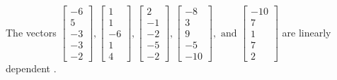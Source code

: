 \begin{exercise}
\begin{exerciseStatement}
  \end{exerciseStatement}
  \begin{exerciseAnswer}
   The vectors \(\left[\begin{array}{r}
-6 \\
5 \\
-3 \\
-3 \\
-2
\end{array}\right] , \left[\begin{array}{r}
1 \\
1 \\
-6 \\
1 \\
4
\end{array}\right] , \left[\begin{array}{r}
2 \\
-1 \\
-2 \\
-5 \\
-2
\end{array}\right] , \left[\begin{array}{r}
-8 \\
3 \\
9 \\
-5 \\
-10
\end{array}\right] , \text{ and } \left[\begin{array}{r}
-10 \\
7 \\
1 \\
7 \\
2
\end{array}\right]\) are 
  	 linearly dependent  .
  


  \end{exerciseAnswer}
\end{exercise}